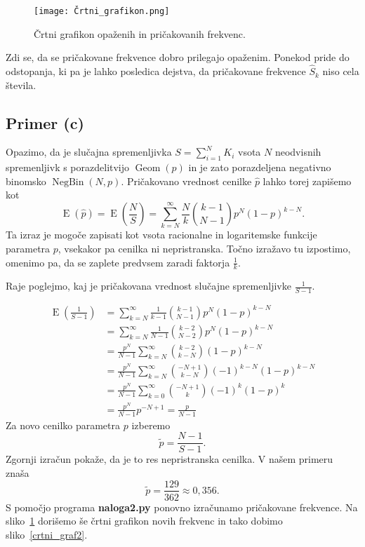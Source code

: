 \documentclass[a4paper,11pt]{article}
\DeclareMathOperator{\E}{E}
\DeclareMathOperator{\Geom}{Geom}
\DeclareMathOperator{\NegBin}{NegBin}
\begin{document}
\begin{figure}[H]
    \centering
    \texttt{[image: Črtni\_grafikon.png]}
    \caption{Črtni grafikon opaženih in pričakovanih frekvenc.}
    \label{crtni_graf1}
\end{figure}

Zdi se, da se pričakovane frekvence dobro prilegajo opaženim. Ponekod pride do odstopanja, 
ki pa je lahko posledica dejstva, da pričakovane frekvence $\hat{S}_k$ niso cela števila.

\subsection*{Primer (c)}

Opazimo, da je slučajna spremenljivka $S = \sum_{i=1}^N K_i$ vsota $N$ neodvisnih spremenljivk s porazdelitvijo $\Geom(p)$ 
in je zato porazdeljena negativno binomsko $\NegBin(N,p)$.
Pričakovano vrednost cenilke $\hat{p}$ lahko torej zapišemo kot
\[\E(\hat{p}) = \E\left(\frac{N}{S}\right) = \sum_{k=N}^{\infty} \frac{N}{k} \binom{k-1}{N-1}p^N(1-p)^{k-N}.\]
Ta izraz je mogoče zapisati kot vsota racionalne in logaritemske funkcije parametra $p$, vsekakor pa cenilka ni nepristranska.
Točno izražavo tu izpostimo, omenimo pa, da se zaplete predvsem zaradi faktorja $\frac{1}{k}$. 

Raje poglejmo, kaj je pričakovana vrednost slučajne spremenljivke $\frac{1}{S-1}$. 

\begin{align*}
\E\left(\frac{1}{S-1}\right) &= \sum_{k=N}^{\infty} \frac{1}{k-1} \binom{k-1}{N-1}p^N(1-p)^{k-N} \\
    &= \sum_{k=N}^{\infty} \frac{1}{N-1} \binom{k-2}{N-2}p^N(1-p)^{k-N} \\
    &= \frac{p^N}{N-1} \sum_{k=N}^{\infty} \binom{k-2}{k-N}(1-p)^{k-N} \\
    &= \frac{p^N}{N-1} \sum_{k=N}^{\infty} \binom{-N+1}{k-N}(-1)^{k-N}(1-p)^{k-N} \\
    &= \frac{p^N}{N-1} \sum_{k=0}^{\infty} \binom{-N+1}{k}(-1)^k(1-p)^k \\
    &= \frac{p^N}{N-1} p^{-N+1} = \frac{p}{N-1}
\end{align*}
Za novo cenilko parametra $p$ izberemo
\[\tilde{p} = \frac{N-1}{S-1}.\] 
Zgornji izračun pokaže, da je to res nepristranska cenilka.
V našem primeru znaša
\[\tilde{p} = \frac{129}{362} \approx 0,356.\]
S pomočjo programa \textbf{naloga2.py} ponovno izračunamo pričakovane frekvence. 
Na sliko~\ref{crtni_graf1} dorišemo še črtni grafikon novih frekvenc in tako dobimo sliko~\ref{crtni_graf2}.
\end{document}
